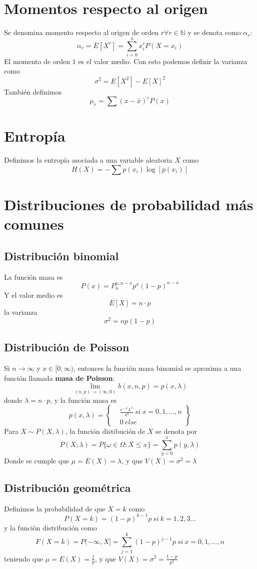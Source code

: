 \documentclass{./Probabilidad.tex}
\begin{document}
\section{Momentos respecto al origen}
Se denomina momento respecto al origen de orden $r \forall r \in \mathbb{N}$ y se denota como $\alpha_{r}$:
$$
\alpha_{r}=E[X^{r}] = \sum_{i=0}^{n} x_{i}^{r}P(X=x_{i})
$$
El momento de orden $1$ es el valor medio. Con esto podemos definir la varianza como
$$
\sigma^{2}=E[X^{2}]-E[X]^{2}
$$
También definimos
$$
\mu_{r} = \sum(x-\bar{x})^rP(x)
$$
\section{Entropía}
Definimos la entropía asociada a una variable aleatoria $X$ como
$$
H(X)= -\sum p(x_{i}) \log[p(x_{i})]
$$
\section{Distribuciones de probabilidad más comunes}
\subsection{Distribución binomial}
La función masa es
\[
	P(x) = P_{n}^{x,n-x}p^{x}(1-p)^{n-x}
\]
Y el valor medio es
\[
	E[X] = n\cdot p
\]
la varianza
\[
	\sigma ^{2}= np(1-p)
\]
\subsection{Distribución de Poisson}
Si $n \to \infty$ y $x \in [0, \infty)$, entonces la función masa binomial se aproxima a una función llamada \textbf{masa de Poisson}:
\[
	\lim_{(n,p) \to (\infty,0)} b(x,n,p)=p(x,\lambda) 
\]
donde $\lambda = n\cdot p$, y la función masa es
\[
	p(x,\lambda) = \left\{
		\begin{matrix}
			&\frac{e^{-\lambda} \lambda^{x}}{x!}~si~x=0,1,\dots ,n\\
			&0~else
	\end{matrix}\right\}
\]
Para $X\sim P(X,\lambda)$, la función distibución de $X$ se denota por
\[
	P(X;\lambda)=P \{ \omega \in \Omega : X \leq x\} = \sum_{y=0}^{x} p(y,\lambda)
\]
Donde se cumple que $\mu = E(X) = \lambda$, y que $V(X) = \sigma ^{2} = \lambda$ 
\subsection{Distribución geométrica}
Definimos la probabilidad de que $X=k$ como
\[
	P(X=k)=(1-p)^{k-1}p~si~k=1,2,3\dots 
\]
y la función distribución como
\[
	F(X=k)=P(-\infty,X]= \sum_{j=1}^{k} (1-p)^{j-1}p~si~x=0,1,\dots ,n
\]
teniendo que $\mu=E(X)=\frac{1}{p}$, y que $V(X)=\sigma ^{2}= \frac{1-p}{p ^{2}}$
\end{document}
